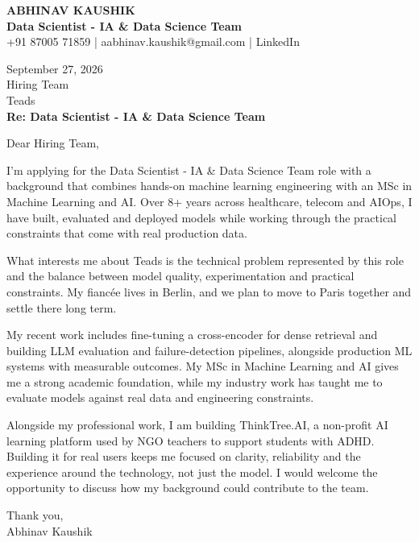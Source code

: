 \documentclass[10pt,a4paper]{article}
\begin{document}
\begin{center}
{\Large\bfseries ABHINAV KAUSHIK}\\[2pt]
{\bfseries Data Scientist - IA \& Data Science Team}\\[2pt]
+91 87005 71859 \quad | \quad aabhinav.kaushik@gmail.com \quad | \quad LinkedIn
\end{center}
\vspace{8pt}
September 27, 2026\\[6pt]
Hiring Team\\
Teads\\[4pt]
\textbf{Re: Data Scientist - IA \& Data Science Team}

Dear Hiring Team,

I’m applying for the Data Scientist - IA \& Data Science Team role with a background that combines hands-on machine learning engineering with an MSc in Machine Learning and AI. Over 8+ years across healthcare, telecom and AIOps, I have built, evaluated and deployed models while working through the practical constraints that come with real production data.

What interests me about Teads is the technical problem represented by this role and the balance between model quality, experimentation and practical constraints. My fiancée lives in Berlin, and we plan to move to Paris together and settle there long term.

My recent work includes fine-tuning a cross-encoder for dense retrieval and building LLM evaluation and failure-detection pipelines, alongside production ML systems with measurable outcomes. My MSc in Machine Learning and AI gives me a strong academic foundation, while my industry work has taught me to evaluate models against real data and engineering constraints.

Alongside my professional work, I am building ThinkTree.AI, a non-profit AI learning platform used by NGO teachers to support students with ADHD. Building it for real users keeps me focused on clarity, reliability and the experience around the technology, not just the model. I would welcome the opportunity to discuss how my background could contribute to the team.

Thank you,\\
Abhinav Kaushik
\end{document}
